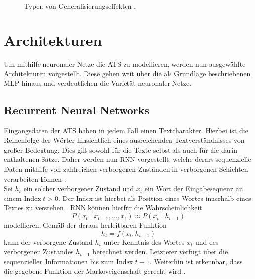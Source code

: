 \begin{figure}[h!]
  \centering
  \caption{Typen von Generalisierungseffekten \cite{EDPOJ}.}
  \label{pic:FittingTypes}
\end{figure}


\section{Architekturen}
\noindent
Um mithilfe neuronaler Netze die \ac{ATS} zu modellieren, werden nun ausgewählte Architekturen vorgestellt. Diese gehen weit über die als Grundlage beschriebenen \ac{MLP} hinaus und verdeutlichen die Varietät neuronaler Netze.


\subsection{Recurrent Neural Networks}
\noindent
Eingangsdaten der \ac{ATS} haben in jedem Fall einen Textcharakter. Hierbei ist die Reihenfolge der Wörter hinsichtlich eines ausreichenden Textverständnisses von großer Bedeutung. Dies gilt sowohl für die Texte selbst als auch für die darin enthaltenen Sätze. Daher werden nun \ac{RNN} vorgestellt, welche derart sequenzielle Daten mithilfe von zahlreichen verborgenen Zuständen in verborgenen Schichten verarbeiten können \cite[S.~301]{ZHA20}.\\

\noindent
Sei $h_t$ ein solcher verborgener Zustand und $x_t$ ein Wort der Eingabesequenz an einem Index $t > 0$. Der Index ist hierbei als Position eines Wortes innerhalb eines Textes zu verstehen \cite{VAS17}. \ac{RNN} können hierfür die Wahrscheinlichkeit $$P(x_t \mid x_{t-1}, ... , x_1) \approx P(x_t \mid h_{t-1})$$ modellieren. Gemäß der daraus herleitbaren Funktion $$h_t = f(x_t, h_{t-1})$$ kann der verborgene Zustand $h_t$ unter Kenntnis des Wortes $x_t$ und des verborgenen Zustandes $h_{t-1}$ berechnet werden. Letzterer verfügt über die sequenziellen Informationen bis zum Index $t-1$. Weiterhin ist erkennbar, dass die gegebene Funktion der Markoveigenschaft gerecht wird \cite[S.~323-324]{ZHA20}.\\

